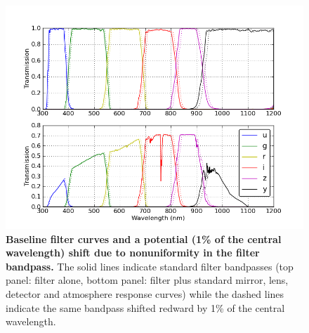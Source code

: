 \documentclass[12pt,preprint]{aastex}
\begin{document}
\begin{figure}
\centering
\includegraphics[width=6in]{filter_shifts}
\caption{{\small 
{\bf Baseline filter curves and a potential (1\% of the central
  wavelength) shift due to nonuniformity in the filter bandpass.}
The solid lines indicate standard filter bandpasses (top panel: filter
alone, bottom panel: filter plus standard mirror, lens, detector and atmosphere
response curves) while the dashed lines indicate the same bandpass
shifted redward by 1\% of the central wavelength.}}
\label{fig:filtershift}
\end{figure}
\end{document}
